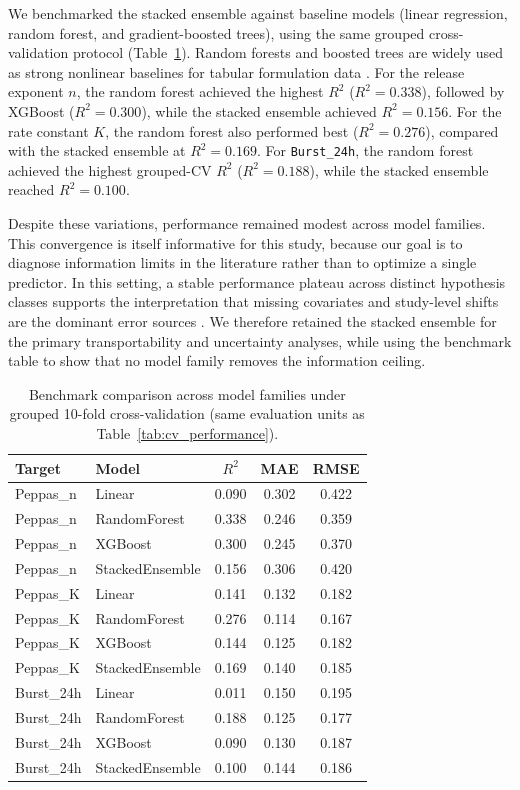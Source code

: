 \documentclass[preprint,12pt,authoryear]{elsarticle}
\begin{document}
We benchmarked the stacked ensemble against baseline models (linear regression, random forest, and gradient-boosted trees), using the same grouped cross-validation protocol (Table~\ref{tab:benchmarking}). Random forests and boosted trees are widely used as strong nonlinear baselines for tabular formulation data \citep{Breiman2001RF, Chen2016XGBoost}. For the release exponent $n$, the random forest achieved the highest $R^2$ ($R^2 = 0.338$), followed by XGBoost ($R^2 = 0.300$), while the stacked ensemble achieved $R^2 = 0.156$. For the rate constant $K$, the random forest also performed best ($R^2 = 0.276$), compared with the stacked ensemble at $R^2 = 0.169$. For \texttt{Burst\_24h}, the random forest achieved the highest grouped-CV $R^2$ ($R^2 = 0.188$), while the stacked ensemble reached $R^2 = 0.100$.

Despite these variations, performance remained modest across model families. This convergence is itself informative for this study, because our goal is to diagnose information limits in the literature rather than to optimize a single predictor. In this setting, a stable performance plateau across distinct hypothesis classes supports the interpretation that missing covariates and study-level shifts are the dominant error sources \citep{Bao2025IJP, Bannigan2021}. We therefore retained the stacked ensemble for the primary transportability and uncertainty analyses, while using the benchmark table to show that no model family removes the information ceiling.

\begin{table}[H]
\centering
\caption{Benchmark comparison across model families under grouped 10-fold cross-validation (same evaluation units as Table~\ref{tab:cv_performance}).}
\label{tab:benchmarking}
\begin{tabular}{llccc}
\toprule
Target & Model & $R^2$ & MAE & RMSE \\
\midrule
Peppas\_n & Linear & 0.090 & 0.302 & 0.422 \\
Peppas\_n & RandomForest & 0.338 & 0.246 & 0.359 \\
Peppas\_n & XGBoost & 0.300 & 0.245 & 0.370 \\
Peppas\_n & StackedEnsemble & 0.156 & 0.306 & 0.420 \\
\midrule
Peppas\_K & Linear & 0.141 & 0.132 & 0.182 \\
Peppas\_K & RandomForest & 0.276 & 0.114 & 0.167 \\
Peppas\_K & XGBoost & 0.144 & 0.125 & 0.182 \\
Peppas\_K & StackedEnsemble & 0.169 & 0.140 & 0.185 \\
\midrule
Burst\_24h & Linear & 0.011 & 0.150 & 0.195 \\
Burst\_24h & RandomForest & 0.188 & 0.125 & 0.177 \\
Burst\_24h & XGBoost & 0.090 & 0.130 & 0.187 \\
Burst\_24h & StackedEnsemble & 0.100 & 0.144 & 0.186 \\
\bottomrule
\end{tabular}
\end{table}
\end{document}
